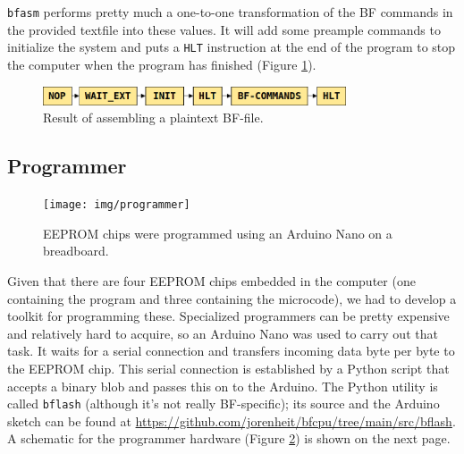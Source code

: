 \texttt{bfasm} performs pretty much a one-to-one transformation of the BF commands in the provided textfile into these values. It will add some preample commands to initialize the system and puts a \texttt{HLT} instruction at the end of the program to stop the computer when the program has finished (Figure \ref{fig:assembleoutput}).

\begin{figure}[H]
  \centering
  \includegraphics[width=0.8\textwidth]{img/assembleroutput}
  \caption{Result of assembling a plaintext BF-file.}
  \label{fig:assembleoutput}
\end{figure}


\subsection{Programmer} \label{sec:utilities:bflash}

\begin{figure}[H]
  \centering
  \texttt{[image: img/programmer]}
  \caption{EEPROM chips were programmed using an Arduino Nano on a breadboard.}
  \label{fig:programmer}
\end{figure}

Given that there are four EEPROM chips embedded in the computer (one containing the program and three containing the microcode), we had to develop a toolkit for programming these. Specialized programmers can be pretty expensive and relatively hard to acquire, so an Arduino Nano was used to carry out that task. It waits for a serial connection and transfers incoming data byte per byte to the EEPROM chip. This serial connection is established by a Python script that accepts a binary blob and passes this on to the Arduino. The Python utility is called \texttt{bflash} (although it's not really BF-specific); its source and the Arduino sketch can be found at \url{https://github.com/jorenheit/bfcpu/tree/main/src/bflash}. A schematic for the programmer hardware (Figure \ref{fig:programmer}) is shown on the next page.



